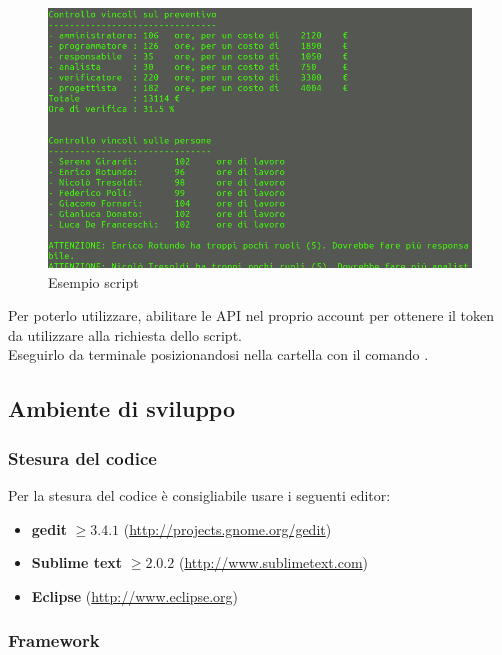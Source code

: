 \begin{figure}[H]
    \centering
    \includegraphics[scale=0.35] {ScriptGantt.png} 
    \caption{Esempio script}
\end{figure}

Per poterlo utilizzare, abilitare le API nel proprio account  per ottenere il token da utilizzare alla richiesta dello script. \\
Eseguirlo da terminale posizionandosi nella cartella  con il comando .

	\subsection{Ambiente di sviluppo}
		
		\subsubsection{Stesura del codice}
		
		Per la stesura del codice è consigliabile usare i seguenti editor:
		\begin{itemize}
			\item \textbf{gedit} $\geq 3.4.1$ (\url{http://projects.gnome.org/gedit})
			\item \textbf{Sublime text} $\geq 2.0.2$ (\url{http://www.sublimetext.com})
			\item \textbf{Eclipse} (\url{http://www.eclipse.org})
		\end{itemize}
		
		\subsubsection{Framework}
		
